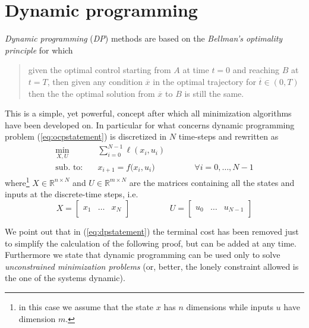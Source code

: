 \section{Dynamic programming} \label{sec:dynamicprogramming}
	\textit{Dynamic programming} (\textit{DP}) methods are based on the \textit{Bellman's optimality principle} for which
	\begin{quote}
		given the optimal control starting from $A$ at time $t=0$ and reaching $B$ at $t=T$, then given any condition $\overline x$ in the optimal trajectory for $\overline t \in (0, T)$ then the the optimal solution from $\overline x$ to $B$ is still the same.
	\end{quote}
	This is a simple, yet powerful, concept after which all minimization algorithms have been developed on. In particular for what concerns dynamic programming problem (\ref{eq:ocpstatement}) is discretized in $N$ time-steps and rewritten as
	\begin{equation} \label{eq:dpstatement}
	\begin{aligned}
		\min_{X,U} \quad & \sum_{i=0}^{N-1} \ell(x_i, u_i) \\
		\textrm{sub. to:} \quad & x_{i+1} = f\big(x_i, u_i\big) \hspace{2cm} \forall i = 0,\dots, N-1
	\end{aligned}
	\end{equation}
	where\footnote{in this case we assume that the state $x$ has $n$ dimensions while inputs $u$ have dimension $m$.} $X \in \mathds R^{n\times N}$ and $U \in \mathds R^{m \times N}$ are the matrices containing all the states and inputs at the discrete-time steps, i.e.
	\begin{equation}
		X = \begin{bmatrix}
			& \\ x_1 & \dots & x_N \\ &
		\end{bmatrix} \hspace{2cm}
		U = \begin{bmatrix}
			& \\ u_0 & \dots & u_{N-1} \\ &
		\end{bmatrix}
	\end{equation}

	We point out that in (\ref{eq:dpstatement}) the terminal cost has been removed just to simplify the calculation of the following proof, but can be added at any time. \\ Furthermore we state that dynamic programming can be used only to solve \textit{unconstrained minimization problems} (or, better, the lonely constraint allowed is the one of the systems dynamic).
	
